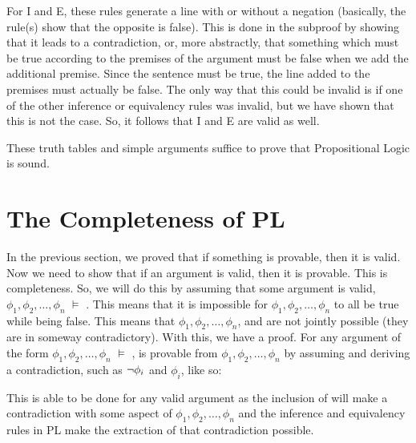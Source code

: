 For \enot I and \enot E, these rules generate a line with or without a negation (basically, the rule(s) show that the opposite is false). This is done in the subproof by showing that it leads to a contradiction, or, more abstractly, that something which must be true according to the premises of the argument must be false when we add the additional premise. Since the sentence must be true, the line added to the premises must actually be false. The only way that this could be invalid is if one of the other inference or equivalency rules was invalid, but we have shown that this is not the case. So, it follows that \enot I and \enot E are valid as well. 

These truth tables and simple arguments suffice to prove that Propositional Logic is sound.  

\section{The Completeness of PL}
In the previous section, we proved that if something is provable, then it is valid. Now we need to show that if an argument is valid, then it is provable. This is completeness. So, we will do this by assuming that some argument is valid, $\phi_1,\phi_2,\ldots,\phi_n$ $\vDash$ . This means that it is impossible for  $\phi_1,\phi_2,\ldots,\phi_n$ to all be true while  being false. This means that $\phi_1,\phi_2,\ldots,\phi_n$, and \enot {} are not jointly possible (they are in someway contradictory). With this, we have a proof. For any argument of the form $\phi_1,\phi_2,\ldots,\phi_n$ $\vDash$ ,  is provable from $\phi_1,\phi_2,\ldots,\phi_n$ by assuming \enot {} and deriving a contradiction, such as $\neg\phi_i$ and $\phi_i$, like so:
\begin{fitchproof}
\ellipsesline
{}
\open
{}
\ellipsesline
{}
\close
{}
\end{fitchproof}
This is able to be done for any valid argument as the inclusion of \enot{} will make a contradiction with some aspect of  $\phi_1,\phi_2,\ldots,\phi_n$ and the inference and equivalency rules in PL make the extraction of that contradiction possible. 

